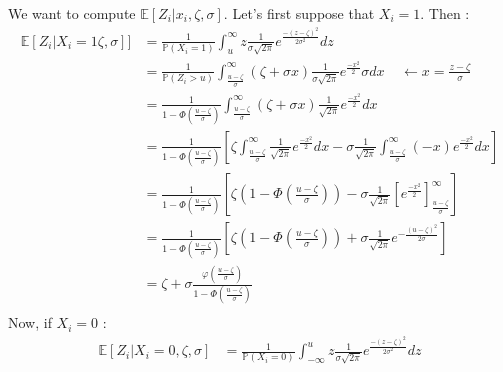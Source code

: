 \documentclass{article}
\begin{document}
We want to compute $\mathbb{E}[Z_i |x_i, \zeta, \sigma]$. Let's first suppose that $X_i=1$. 
Then :
\begin{align*}
    \mathbb{E}[Z_i | X_i=1\zeta, \sigma]] &= \frac{1}{\mathbb{P}(X_i=1)}
                              \int_{u}^{\infty}
                              z
                              \frac{1}{\sigma \sqrt{2\pi}} 
                              e^{ \frac{-(z-\zeta)^2}{2 \sigma^2}  } dz \\
        &= \frac{1}{\mathbb{P}(Z_i > u)}
             \int_{\frac{u-\zeta}{\sigma}}^{\infty} 
             (\zeta+\sigma x) 
             \frac{1}{\sigma \sqrt{2\pi}} 
             e^{ \frac{-x^2}{2}  } 
             \sigma dx \ \ \ \ \ \leftarrow x=\frac{z-\zeta}{\sigma} \\
        &= \frac{1}{1 - \Phi(\frac{u-\zeta}{\sigma})}
            \int_{\frac{u-\zeta}{\sigma}}^{\infty}
            (\zeta+\sigma x) 
            \frac{1}{ \sqrt{2\pi}} 
            e^{ \frac{-x^2}{2}  } 
            dx \\
        &= \frac{1}{1 - \Phi(\frac{u-\zeta}{\sigma})}
            \left [
            \zeta
            \int_{\frac{u-\zeta}{\sigma}}^{\infty}
            \frac{1}{ \sqrt{2\pi}} 
            e^{ \frac{-x^2}{2}  } 
            dx
            -
            \sigma  \frac{1}{\sqrt{2\pi}}
            \int_{\frac{u-\zeta}{\sigma}}^{\infty}
            (-x) 
            e^{ \frac{-x^2}{2}  } 
            dx
            \right ] \\
        &= \frac{1}{1 - \Phi(\frac{u-\zeta}{\sigma} )}
            \left [
            \zeta
            (1 - \Phi \left (\frac{u-\zeta}{\sigma}\right ) )
            -
            \sigma \frac{1}{\sqrt{2\pi}}
            \left [
            e^{ \frac{-x^2}{2}  } 
            \right ]^{\infty}_{\frac{u-\zeta}{\sigma}}
            \right ] \\
        &= \frac{1}{1 - \Phi(\frac{u-\zeta}{\sigma} )}
            \left [
            \zeta
            (1- \Phi \left (\frac{u-\zeta}{\sigma}\right ) )
            +
            \sigma \frac{1}{\sqrt{2\pi}}
            e^{ -\frac{(u-\zeta)^2}{2\sigma}  } 
            \right ] \\
        &= \zeta + \sigma 
        \frac{\varphi \left ( \frac{u-\zeta}{\sigma} \right )}
        {1- \Phi \left (\frac{u-\zeta}{\sigma}\right )} \\
\end{align*}
Now, if $X_i=0$ : 
\begin{align*}
\mathbb{E}[Z_i | X_i=0, \zeta, \sigma] &= \frac{1}{\mathbb{P}(X_i=0)}
    \int_{-\infty}^{u}
    z
    \frac{1}{\sigma \sqrt{2\pi}} 
    e^{ \frac{-(z-\zeta)^2}{2 \sigma^2}  } dz \\
\end{align*}
\end{document}
